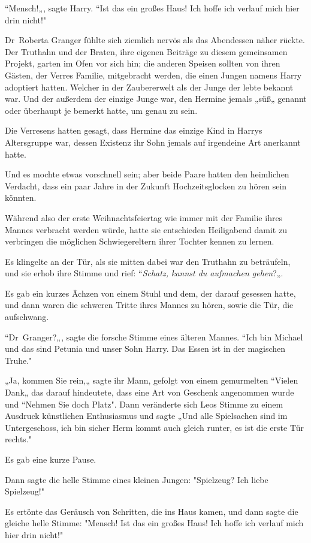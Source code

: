 {“Mensch!„, sagte Harry. “Ist das ein großes Haus! Ich hoffe ich verlauf mich hier drin nicht!"

Dr~Roberta Granger fühlte sich ziemlich nervös als das Abendessen näher rückte. Der Truthahn und der Braten, ihre eigenen Beiträge zu diesem gemeinsamen Projekt, garten im Ofen vor sich hin; die anderen Speisen sollten von ihren Gästen, der Verres Familie, mitgebracht werden, die einen Jungen namens Harry adoptiert hatten. Welcher in der Zaubererwelt als der Junge der lebte bekannt war. Und der außerdem der einzige Junge war, den Hermine jemals „süß„ genannt oder überhaupt je bemerkt hatte, um genau zu sein.

Die Verresens hatten gesagt, dass Hermine das einzige Kind in Harrys Altersgruppe war, dessen Existenz ihr Sohn jemals auf irgendeine Art anerkannt hatte.

Und es mochte etwas vorschnell sein; aber beide Paare hatten den heimlichen Verdacht, dass ein paar Jahre in der Zukunft Hochzeitsglocken zu hören sein könnten.

Während also der erste Weihnachtsfeiertag wie immer mit der Familie ihres Mannes verbracht werden würde, hatte sie entschieden Heiligabend damit zu verbringen die möglichen Schwiegereltern ihrer Tochter kennen zu lernen.

Es klingelte an der Tür, als sie mitten dabei war den Truthahn zu beträufeln, und sie erhob ihre Stimme und rief: “\emph{Schatz, kannst du aufmachen gehen}?„.

Es gab ein kurzes Ächzen von einem Stuhl und dem, der darauf gesessen hatte, und dann waren die schweren Tritte ihres Mannes zu hören, sowie die Tür, die aufschwang.

“Dr~Granger?„, sagte die forsche Stimme eines älteren Mannes. “Ich bin Michael und das sind Petunia und unser Sohn Harry. Das Essen ist in der magischen Truhe."

„Ja, kommen Sie rein,„ sagte ihr Mann, gefolgt von einem gemurmelten “Vielen Dank„ das darauf hindeutete, dass eine Art von Geschenk angenommen wurde und “Nehmen Sie doch Platz". Dann veränderte sich Leos Stimme zu einem Ausdruck künstlichen Enthusiasmus und sagte „Und alle Spielsachen sind im Untergeschoss, ich bin sicher Herm kommt auch gleich runter, es ist die erste Tür rechts."

Es gab eine kurze Pause.

Dann sagte die helle Stimme eines kleinen Jungen: "Spielzeug? Ich liebe Spielzeug!"

Es ertönte das Geräusch von Schritten, die ins Haus kamen, und dann sagte die gleiche helle Stimme: "Mensch! Ist das ein großes Haus! Ich hoffe ich verlauf mich hier drin nicht!"

}
